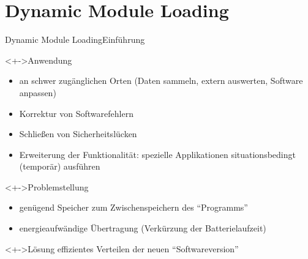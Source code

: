 \section{Dynamic Module Loading}

%
%
%
%
%
%

\begin{frame}{Dynamic Module Loading}{Einführung}
	\begin{exampleblock}<+->{Anwendung}
		\begin{itemize}
		\item 	an schwer zugänglichen Orten
				(Daten sammeln, extern auswerten, Software anpassen)
		\item 	Korrektur von Softwarefehlern
		\item 	Schließen von Sicherheitslücken
		\item 	Erweiterung der Funktionalität:
				spezielle Applikationen situationsbedingt (temporär) ausführen
		\end{itemize}
	\end{exampleblock}
	\begin{block}<+->{Problemstellung}
		\begin{itemize}
		\item 	genügend Speicher zum Zwischenspeichern des \enquote{Programms}
		\item 	energieaufwändige Übertragung (Verkürzung der Batterielaufzeit)
		\end{itemize}
	\end{block}
	\begin{alertblock}<+->{Lösung}
		effizientes Verteilen der neuen \enquote{Softwareversion}
	\end{alertblock}
\end{frame}
